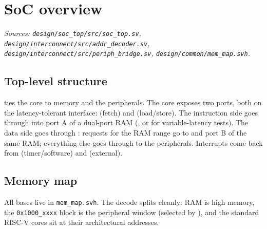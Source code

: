 \section{SoC overview}
{\sloppy\textit{Sources: \texttt{design/soc\_top/src/soc\_top.sv},
\texttt{design/interconnect/src/addr\_decoder.sv},
\texttt{design/interconnect/src/periph\_bridge.sv},
\texttt{design/common/mem\_map.svh}.}\par}

\subsection{Top-level structure}
 ties the core to memory and the peripherals. The core exposes two
ports, both on the latency-tolerant  interface:  (fetch)
and  (load/store). The instruction side goes through  into
port A of a dual-port RAM (, or  for
variable-latency tests). The data side goes through : requests for
the RAM range go to  and port B of the same RAM; everything else goes
through  to the peripherals. Interrupts come back from
 (timer/software) and  (external).


\subsection{Memory map}
All bases live in \texttt{mem\_map.svh}. The decode splits cleanly: RAM is high
memory, the \texttt{0x1000\_xxxx} block is the peripheral window (selected by
), and the standard RISC-V cores sit at their architectural
addresses.


